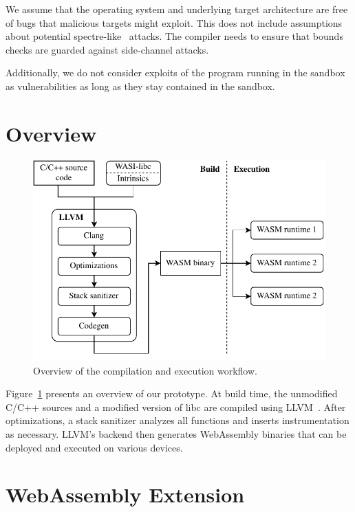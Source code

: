 \noindent
We assume that the operating system and underlying target architecture are free of bugs that malicious targets might exploit.
This does not include assumptions about potential spectre-like~\cite{kocher2020spectre} attacks.
The compiler needs to ensure that bounds checks are guarded against side-channel attacks.

Additionally, we do not consider exploits of the program running in the sandbox as vulnerabilities as long as they stay contained in the sandbox.


\section{Overview}
\label{sec:overview}

\begin{figure}[t]
    \centering
    \includegraphics{figures/build/overview}
    \caption{Overview of the compilation and execution workflow.}
    \label{fig:overview}
\end{figure}

Figure~\ref{fig:overview} presents an overview of our prototype.
At build time, the unmodified C/C++ sources and a modified version of libc are compiled using LLVM~\cite{lattner2004llvm}.
After optimizations, a stack sanitizer analyzes all functions and inserts instrumentation as necessary.
LLVM's backend then generates WebAssembly binaries that can be deployed and executed on various devices.


\section{WebAssembly Extension}
\label{sec:wasm-extension}

